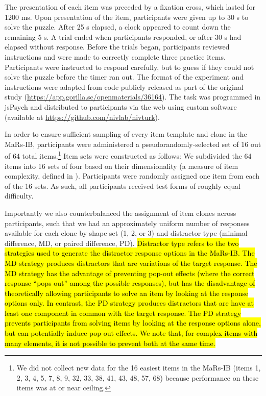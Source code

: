 \documentclass[a4paper,man,natbib]{apa6}
\begin{document}
The presentation of each item was preceded by a fixation cross, which lasted for 1200 ms. Upon presentation of the item, participants were given up to 30 s to solve the puzzle. After 25 s elapsed, a clock appeared to count down the remaining 5 s. A trial ended when participants responded, or after 30 s had elapsed without response. Before the trials began, participants reviewed instructions and were made to correctly complete three practice items. Participants were instructed to respond carefully, but to guess if they could not solve the puzzle before the timer ran out. The format of the experiment and instructions were adapted from code publicly released as part of the original study (\url{https://app.gorilla.sc/openmaterials/36164}). The task was programmed in jsPsych \citep{de2015jspsych} and distributed to participants via the web using custom software (available at \url{https://github.com/nivlab/nivturk}). 

In order to ensure sufficient sampling of every item template and clone in the MaRs-IB, participants were administered a pseudorandomly-selected set of 16 out of 64 total items.\footnote{We did not collect new data for the 16 easiest items in the MaRs-IB (items 1, 2, 3, 4, 5, 7, 8, 9, 32, 33, 38, 41, 43, 48, 57, 68) because performance on these items was at or near ceiling.} Item sets were constructed as follows: We subdivided the 64 items into 16 sets of four based on their dimensionality (a measure of item complexity, defined in \citealt{chierchia2019matrix}). Participants were randomly assigned one item from each of the 16 sets. As such, all participants received test forms of roughly equal difficulty. 

Importantly we also counterbalanced the assignment of item clones across participants, such that we had an approximately uniform number of responses available for each clone by shape set (1, 2, or 3) and distractor type (minimal difference, MD, or paired difference, PD). \hl{Distractor type refers to the two strategies used to generate the distractor response options in the MaRs-IB. The MD strategy produces distractors that are variations of the target response. The MD strategy has the advantage of preventing pop-out effects (where the correct response ``pops out'' among the possible responses), but has the disadvantage of theoretically allowing participants to solve an item by looking at the response options only. In contrast, the PD strategy produces distractors that are have at least one component in common with the target response. The PD strategy prevents participants from solving items by looking at the response options alone, but can potentially induce pop-out effects. We note that, for complex items with many elements, it is not possible to prevent both at the same time.}
\end{document}
